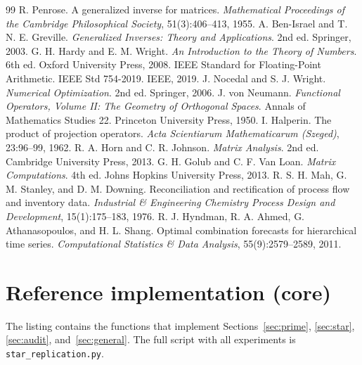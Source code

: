 \documentclass[11pt,letterpaper]{article}
\theoremstyle{plain}
\theoremstyle{definition}
\theoremstyle{remark}
\begin{document}
\begin{thebibliography}{99}\setlength{\itemsep}{0.3em}
 R. Penrose. A generalized inverse for matrices. \emph{Mathematical Proceedings of the Cambridge Philosophical Society}, 51(3):406--413, 1955.
 A. Ben-Israel and T. N. E. Greville. \emph{Generalized Inverses: Theory and Applications}. 2nd ed. Springer, 2003.
 G. H. Hardy and E. M. Wright. \emph{An Introduction to the Theory of Numbers}. 6th ed. Oxford University Press, 2008.
 IEEE Standard for Floating-Point Arithmetic. IEEE Std 754-2019. IEEE, 2019.
 J. Nocedal and S. J. Wright. \emph{Numerical Optimization}. 2nd ed. Springer, 2006.
 J. von Neumann. \emph{Functional Operators, Volume II: The Geometry of Orthogonal Spaces}. Annals of Mathematics Studies 22. Princeton University Press, 1950.
 I. Halperin. The product of projection operators. \emph{Acta Scientiarum Mathematicarum (Szeged)}, 23:96--99, 1962.
 R. A. Horn and C. R. Johnson. \emph{Matrix Analysis}. 2nd ed. Cambridge University Press, 2013.
 G. H. Golub and C. F. Van Loan. \emph{Matrix Computations}. 4th ed. Johns Hopkins University Press, 2013.
 R. S. H. Mah, G. M. Stanley, and D. M. Downing. Reconciliation and rectification of process flow and inventory data. \emph{Industrial \& Engineering Chemistry Process Design and Development}, 15(1):175--183, 1976.
 R. J. Hyndman, R. A. Ahmed, G. Athanasopoulos, and H. L. Shang. Optimal combination forecasts for hierarchical time series. \emph{Computational Statistics \& Data Analysis}, 55(9):2579--2589, 2011.
\end{thebibliography}

\appendix
\section{Reference implementation (core)}

The listing contains the functions that implement Sections~\ref{sec:prime}, \ref{sec:star}, \ref{sec:audit}, and~\ref{sec:general}. The full script with all experiments is \texttt{star\_replication.py}.
\end{document}
